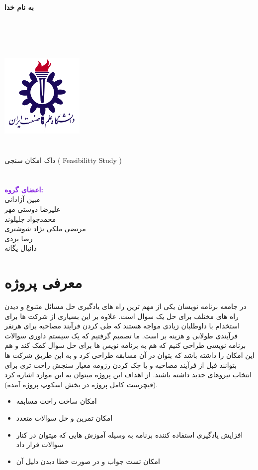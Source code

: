 \documentclass{article}
\begin{document}
	\begin{center}
		\Large
		\textbf{به نام خدا}

		~\\
		~\\
		~\\
		~\\
	\includegraphics[width=0.3\textwidth]{assets/IUST_Logo.png}
	~\\
	~\\
	~\\
	
	داک امکان سنجی 
	( Feasibilitty Study )
	~\\
	~\\
	~\\
	
\textcolor{BlueViolet}{\textbf{اعضای گروه:} }\\
	مبین آزادانی \\
	علیرضا دوستی مهر \\
	محمدجواد جلیلوند \\
	مرتضی ملکی نژاد شوشتری \\
	رضا یزدی \\
	دانیال یگانه
	\end{center}
	\newpage
	\tableofcontents
	\newpage
	\section{معرفی پروژه}
	در جامعه برنامه نویسان یکی از مهم ترین راه های یادگیری حل مسائل متنوع و دیدن راه های مختلف برای حل یک سوال است. علاوه بر این بسیاری از شرکت ها برای استخدام با داوطلبان زیادی مواجه هستند که طی کردن فرآیند مصاحبه برای هرنفر فرآیندی طولانی و هزینه بر است. ما تصمیم گرفتیم که یک سیستم داوری سوالات برنامه نویسی طراحی کنیم که هم به برنامه نویس ها برای حل سوال کمک کند و هم این امکان را داشته باشد که بتوان در آن مسابقه طراحی کرد و به این طریق شرکت ها بتوانند قبل از فرآیند مصاحبه و یا چک کردن رزومه معیار سنجش راحت تری برای انتخاب نیروهای جدید داشته باشند.
	از اهداف این پروژه میتوان به این موارد اشاره کرد (فیچرست کامل پروژه در بخش اسکوپ پروژه آمده).
	\begin{itemize}
		\item امکان ساخت راحت مسابقه
		\item امکان تمرین و حل سوالات متعدد 
		\item افزایش یادگیری استفاده کننده برنامه به وسیله آموزش هایی که میتوان در کنار سوالات قرار داد
		\item امکان تست جواب و در صورت خطا دیدن دلیل آن
	\end{itemize}
	
\end{document}
